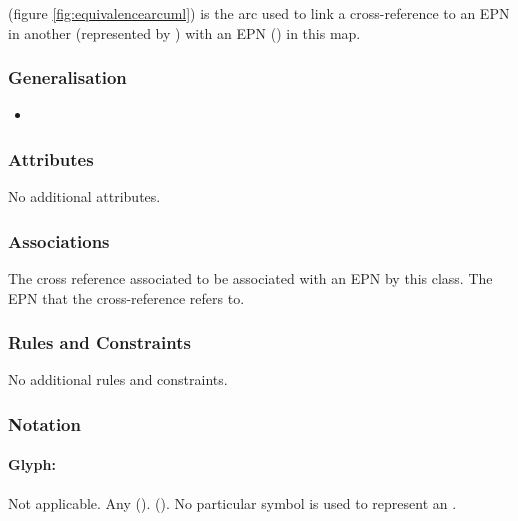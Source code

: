  (figure \ref{fig:equivalencearcuml}) is the arc used to link a cross-reference
to an EPN in another \PDm (represented by )
with an EPN () in this map.

\subsubsection{Generalisation}

\begin{itemize}
\item {}
\end{itemize}

\subsubsection{Attributes}

No additional attributes.

\subsubsection{Associations}

\begin{itemize}
 The cross reference
associated to be associated with an EPN by this class.
 The EPN that the
cross-reference refers to.
\end{itemize}

\subsubsection{Rules and Constraints}

No additional rules and constraints.

\subsubsection{Notation}

\paragraph{Glyph:  }\label{sec:equivalenceArc}

\begin{glyphDescription}
 \glyphSboTerm Not applicable.
 \glyphOrigin Any  ().
 \glyphTarget {} ().
 \glyphEndPoint No particular symbol is used to represent an .
 \end{glyphDescription}

